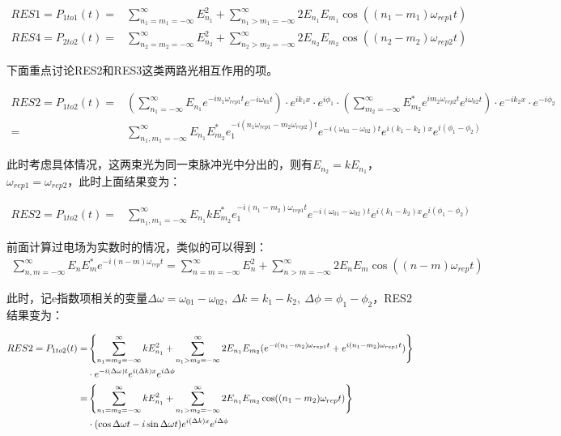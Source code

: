 \begin{align}
    RES1=P_{1to1}(t)=&\sum_{n_1=m_1=-\infty}^{\infty}E_{n_1}^2 + \sum_{n_1>m_1=-\infty}^{\infty}2E_{n_1} E_{m_1} \cos\left((n_1-m_1)\omega_{rep1}t\right)\label{eq:final_res1}\\
    RES4=P_{2to2}(t)=&\sum_{n_2=m_2=-\infty}^{\infty}E_{n_2}^2 + \sum_{n_2>m_2=-\infty}^{\infty}2E_{n_2} E_{m_2} \cos\left((n_2-m_2)\omega_{rep2}t\right)\label{eq:final_res4}
\end{align}


下面重点讨论RES2和RES3这类两路光相互作用的项。
\begin{footnotesize}
\begin{align}
    RES2=P_{1to2}(t)=&\left(\sum_{n_1=-\infty}^{\infty}E_{n_1}e^{-in_1\omega_{rep1}t}e^{-i\omega_{01}t}\right)\cdot e^{ik_1x}\cdot e^{i\phi_1} 
    \cdot \left(\sum_{m_2=-\infty}^{\infty}E_{m_2}^*e^{im_2\omega_{rep2}t}e^{i\omega_{02}t}\right)\cdot e^{-ik_2x}\cdot e^{-i\phi_2}\\
    =&\sum_{n_1,m_1=-\infty}^{\infty}E_{n_1}E_{m_2}^*e_1^{-i(n_1\omega_{rep1}-m_2\omega_{rep2})t}e^{-i(\omega_{01}-\omega_{02})t}e^{i(k_1-k_2)x}e^{i(\phi_1-\phi_2)}
\end{align}
\end{footnotesize}

此时考虑具体情况，这两束光为同一束脉冲光中分出的，则有$E_{n_2}=kE_{n_1}$，$\omega_{rep1}=\omega_{rep2}$，此时上面结果变为：
\begin{footnotesize}
\begin{align}
    RES2=P_{1to2}(t)=&\sum_{n_1,m_1=-\infty}^{\infty}E_{n_1}kE_{m_2}^*e_1^{-i(n_1-m_2)\omega_{rep1}t}e^{-i(\omega_{01}-\omega_{02})t}e^{i(k_1-k_2)x}e^{i(\phi_1-\phi_2)}
\end{align}
\end{footnotesize}

前面计算过电场为实数时的情况，类似的可以得到：
\begin{align}
    \sum_{n,m=-\infty}^{\infty}E_nE_m^*e^{-i(n-m)\omega_{rep}t}=\sum_{n=m=-\infty}^{\infty}E_n^2+\sum_{n>m=-\infty}^{\infty}2E_nE_m\cos((n-m)\omega_{rep}t)
\end{align}

此时，记e指数项相关的变量$\Delta\omega=\omega_{01}-\omega_{02},\ \Delta k=k_1-k_2,\ \Delta\phi=\phi_1-\phi_2$，RES2结果变为：
\begin{footnotesize}
\begin{align}
    RES2=P_{1to2}(t)=&\left\{\sum_{n_1=m_2=-\infty}^{\infty}kE_{n_1}^2+\sum_{n_1>m_2=-\infty}^{\infty}2E_{n_1}E_{m_2}(e^{-i(n_1-m_2)\omega_{rep1}t}+e^{i(n_1-m_2)\omega_{rep1}t})\right\}\\
    & \cdot e^{-i(\Delta\omega)t}e^{i(\Delta k)x}e^{i\Delta\phi}\\
    =&\left\{\sum_{n_1=m_2=-\infty}^{\infty}kE_{n_1}^2+\sum_{n_1>m_2=-\infty}^{\infty}2E_{n_1}E_{m_2}\cos((n_1-m_2)\omega_{rep}t)\right\}\notag\\
    & \cdot (\cos\Delta\omega t-i\sin\Delta\omega t)e^{i(\Delta k)x}e^{i\Delta\phi}\label{eq:final_res2}
\end{align}
\end{footnotesize}

